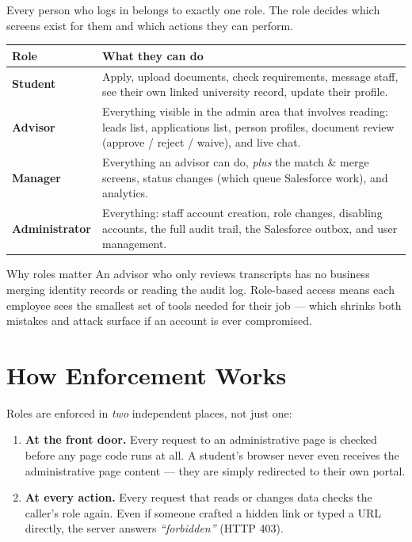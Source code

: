 \documentclass[11pt,letterpaper]{report}
\begin{document}
Every person who logs in belongs to exactly one role. The role decides which
screens exist for them and which actions they can perform.

\begin{center}
\begin{tabularx}{\textwidth}{lX}
\toprule
\textbf{Role} & \textbf{What they can do} \\
\midrule
\textbf{Student} & Apply, upload documents, check requirements, message staff,
                   see their own linked university record, update their profile. \\
\textbf{Advisor} & Everything visible in the admin area that involves reading:
                   leads list, applications list, person profiles, document
                   review (approve / reject / waive), and live chat. \\
\textbf{Manager} & Everything an advisor can do, \emph{plus} the match \& merge
                   screens, status changes (which queue Salesforce work), and
                   analytics. \\
\textbf{Administrator} & Everything: staff account creation, role changes,
                   disabling accounts, the full audit trail, the Salesforce
                   outbox, and user management. \\
\bottomrule
\end{tabularx}
\end{center}

\begin{keybox}{Why roles matter}
An advisor who only reviews transcripts has no business merging identity records
or reading the audit log. Role-based access means each employee sees the
smallest set of tools needed for their job --- which shrinks both mistakes and
attack surface if an account is ever compromised.
\end{keybox}

\section{How Enforcement Works}

Roles are enforced in \emph{two} independent places, not just one:

\begin{enumerate}[leftmargin=1.6em]
  \item \textbf{At the front door.} Every request to an administrative page is
        checked before any page code runs at all. A student's browser never even
        receives the administrative page content --- they are simply redirected
        to their own portal.
  \item \textbf{At every action.} Every request that reads or changes data checks
        the caller's role again. Even if someone crafted a hidden link or typed
        a URL directly, the server answers \emph{``forbidden''} (HTTP 403).
\end{enumerate}
\end{document}
